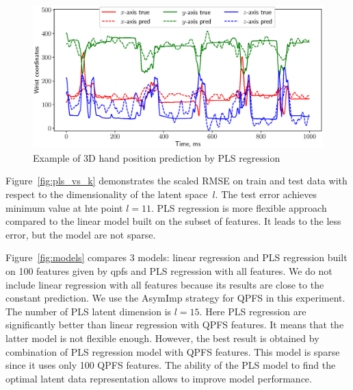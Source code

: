 \documentclass[12pt,oneside]{article}
\theoremstyle{definition}
\begin{document}
\begin{figure}
	\centering
	\includegraphics[width=\linewidth]{figs/ecog_prediction}
	\caption{Example of 3D hand position prediction by PLS regression}
	\label{fig:ecog_prediction}
\end{figure}

Figure~\ref{fig:pls_vs_k} demonstrates the scaled RMSE on train and test data with respect to the dimensionality of the latent space~$l$.
The test error achieves minimum value at hte point $l = 11$.
PLS regression is more flexible approach compared to the linear model built on the subset of features.
It leads to the less error, but the model are not sparse.

Figure~\ref{fig:models} compares 3 models: linear regression and PLS regression built on 100 features given by qpfs and PLS regression with all features.
We do not include linear regression with all features because its results are close to the constant prediction.
We use the AsymImp strategy for QPFS in this experiment.
The number of PLS latent dimension is $l = 15$.
Here PLS regression are significantly better than linear regression with QPFS features.
It means that the latter model is not flexible enough.
However, the best result is obtained by combination of PLS regression model with QPFS features. 
This model is sparse since it uses only 100 QPFS features.
The ability of the PLS model to find the optimal latent data representation allows to improve model performance. 
\end{document}
